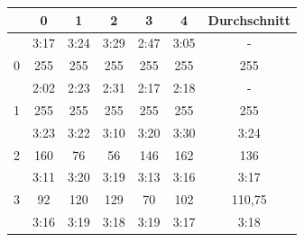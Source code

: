 \documentclass[11pt,final,journal,a4paper,towside,towcolumn]{IEEEtran}
\begin{document}
\begin{table}
	\centering
	\begin{tabular}{|c|c|c|c|c|c|c|}
		\hline
		& 0                                                   & 1                            & 2                            & 3                            & 4                            & Durchschnitt \\ \hline
		& \cellcolor[HTML]{C0C0C0} 3:17 & \cellcolor[HTML]{C0C0C0}3:24 & \cellcolor[HTML]{FFCCC9}3:29 & \cellcolor[HTML]{FFCCC9}2:47 & \cellcolor[HTML]{FFCCC9}3:05 & \cellcolor[HTML]{C0C0C0}-       \\ \cline{2-7} 
		\multirow{-2}{*}{0} & \cellcolor[HTML]{C0C0C0}255 & \cellcolor[HTML]{C0C0C0}255  & \cellcolor[HTML]{FFCCC9}255  & \cellcolor[HTML]{FFCCC9}255  & \cellcolor[HTML]{FFCCC9}255  & \cellcolor[HTML]{C0C0C0}255     \\ \hline
		& \cellcolor[HTML]{C0C0C0}2:02                        & \cellcolor[HTML]{C0C0C0}2:23 & \cellcolor[HTML]{FFCCC9}2:31 & \cellcolor[HTML]{FFCCC9}2:17 & \cellcolor[HTML]{FFCCC9}2:18 & \cellcolor[HTML]{C0C0C0}-       \\ \cline{2-7} 
		\multirow{-2}{*}{1} & \cellcolor[HTML]{C0C0C0}255                         & \cellcolor[HTML]{C0C0C0}255  & \cellcolor[HTML]{FFCCC9}255  & \cellcolor[HTML]{FFCCC9}255  & \cellcolor[HTML]{FFCCC9}255  & \cellcolor[HTML]{C0C0C0}255     \\ \hline
		& \cellcolor[HTML]{9AFF99}3:23                        & \cellcolor[HTML]{9AFF99}3:22 & \cellcolor[HTML]{C0C0C0}3:10 & \cellcolor[HTML]{FFCCC9}3:20 & \cellcolor[HTML]{FFCCC9}3:30 & \cellcolor[HTML]{C0C0C0}3:24    \\ \cline{2-7} 
		\multirow{-2}{*}{2} & \cellcolor[HTML]{9AFF99}160                         & \cellcolor[HTML]{9AFF99}76   & \cellcolor[HTML]{C0C0C0}56   & \cellcolor[HTML]{FFCCC9}146  & \cellcolor[HTML]{FFCCC9}162  & \cellcolor[HTML]{C0C0C0}136     \\ \hline
		& \cellcolor[HTML]{9AFF99}3:11                        & \cellcolor[HTML]{9AFF99}3:20 & \cellcolor[HTML]{9AFF99}3:19 & \cellcolor[HTML]{C0C0C0}3:13 & \cellcolor[HTML]{9AFF99}3:16 & \cellcolor[HTML]{9AFF99}3:17    \\ \cline{2-7} 
		\multirow{-2}{*}{3} & \cellcolor[HTML]{9AFF99}92                          & \cellcolor[HTML]{9AFF99}120  & \cellcolor[HTML]{9AFF99}129  & \cellcolor[HTML]{C0C0C0}70   & \cellcolor[HTML]{9AFF99}102  & \cellcolor[HTML]{9AFF99}110,75  \\ \hline
		& \cellcolor[HTML]{9AFF99}3:16                        & \cellcolor[HTML]{9AFF99}3:19 & \cellcolor[HTML]{9AFF99}3:18 & \cellcolor[HTML]{FFCCC9}3:19 & \cellcolor[HTML]{C0C0C0}3:17 & \cellcolor[HTML]{C0C0C0}3:18    \\ \cline{2-7} 

\end{tabular}
\end{table}
\end{document}
